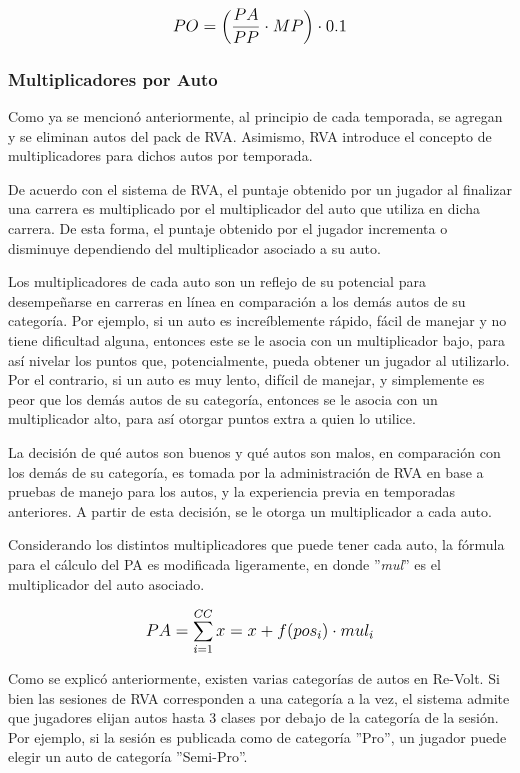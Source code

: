 \[
\mathlarger{{PO} = \left(\frac{PA}{PP} \cdot MP\right) \cdot 0.1}
\]

\subsubsection{Multiplicadores por Auto}
Como ya se mencionó anteriormente, al principio de cada temporada, se agregan y se eliminan autos del pack de RVA. Asimismo, RVA introduce el concepto de multiplicadores para dichos autos por temporada.

De acuerdo con el sistema de RVA, el puntaje obtenido por un jugador al finalizar una carrera es multiplicado por el multiplicador del auto que utiliza en dicha carrera. De esta forma, el puntaje obtenido por el jugador incrementa o disminuye dependiendo del multiplicador asociado a su auto.

Los multiplicadores de cada auto son un reflejo de su potencial para desempeñarse en carreras en línea en comparación a los demás autos de su categoría. Por ejemplo, si un auto es increíblemente rápido, fácil de manejar y no tiene dificultad alguna, entonces este se le asocia con un multiplicador bajo, para así nivelar los puntos que, potencialmente, pueda obtener un jugador al utilizarlo. Por el contrario, si un auto es muy lento, difícil de manejar, y simplemente es peor que los demás autos de su categoría, entonces se le asocia con un multiplicador alto, para así otorgar puntos extra a quien lo utilice.

La decisión de qué autos son buenos y qué autos son malos, en comparación con los demás de su categoría, es tomada por la administración de RVA en base a pruebas de manejo para los autos, y la experiencia previa en temporadas anteriores. A partir de esta decisión, se le otorga un multiplicador a cada auto.

Considerando los distintos multiplicadores que puede tener cada auto, la fórmula para el cálculo del PA es modificada ligeramente, en donde ''\textit{mul}'' es el multiplicador del auto asociado.

\[
\mathlarger{{PA} = \sum_{i=1}^{CC}x=x+f(pos_i) \cdot mul_i}
\]

Como se explicó anteriormente, existen varias categorías de autos en Re-Volt. Si bien las sesiones de RVA corresponden a una categoría a la vez, el sistema admite que jugadores elijan autos hasta 3 clases por debajo de la categoría de la sesión. Por ejemplo, si la sesión es publicada como de categoría ''Pro'', un jugador puede elegir un auto de categoría ''Semi-Pro''.

